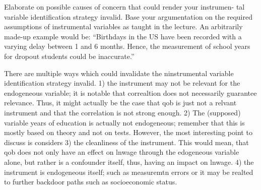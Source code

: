 \documentclass[a4paper]{article}
\begin{document}
Elaborate on possible causes of concern that could render your instrumen-
tal variable identification strategy invalid. Base your argumentation on
the required assumptions of instrumental variables as taught in the lecture.
An arbitrarily made-up example would be: “Birthdays in the US have
been recorded with a varying delay between 1 and 6 months. Hence, the
measurement of school years for dropout students could be inaccurate.”



There are multiple ways which could invalidate the ninstrumental variable identification strategy invalid. 1) the instrument may not be relevant for the endogeneous variable; it is notable that correaltion does not necessarily guarantee relevance. Thus, it might actually be the case that qob is just not a relvant instrument and that the correlation is not strong enough. 2) The (supposed) variable years of education is actually not endogeneous; remember that this is mostly based on theory and not on tests.
However, the most interesting point to discuss is considers 3) the cleanliness of the instrument. This would mean, that qob does not only have an effect on lnwage through the edogeneous variable alone, but rather is a confounder itself, thus, having an impact on lnwage. 
4) the instrument is endogeneous itself; such as measuremtn errors or it may be realted to further backdoor paths such as socioeconomic status. 

\end{document}
